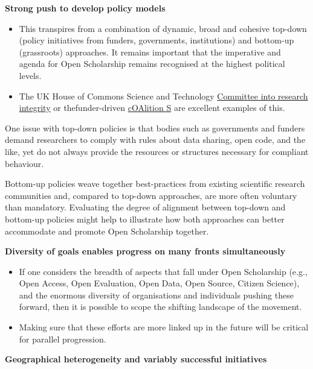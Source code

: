 \textbf{Strong push to develop policy models}

\begin{itemize}
\item
  This transpires from a combination of dynamic, broad and cohesive
  top-down (policy initiatives from funders, governments, institutions)
  and bottom-up (grassroots) approaches. It remains important that the
  imperative and agenda for Open Scholarship remains recognised at the
  highest political levels.
\item
  The UK House of Commons Science and Technology
  \href{https://www.parliament.uk/business/committees/committees-a-z/commons-select/science-and-technology-committee/news-parliament-2017/research-integrity3-evidence-17-19/}{Committee
  into research integrity} or thefunder-driven
  \href{https://www.coalition-s.org/}{cOAlition S} are excellent
  examples of this.
\end{itemize}

One issue with top-down policies is that bodies such as governments and
funders demand researchers to comply with rules about data sharing, open
code, and the like, yet do not always provide the resources or
structures necessary for compliant behaviour.

Bottom-up policies weave together best-practices from existing
scientific research communities and, compared to top-down approaches,
are more often voluntary than mandatory. Evaluating the degree of
alignment between top-down and bottom-up policies might help to
illustrate how both approaches can better accommodate and promote Open
Scholarship together.

\textbf{Diversity of goals enables progress on many fronts
simultaneously}

\begin{itemize}
\item
  If one considers the breadth of aspects that fall under Open
  Scholarship (e.g., Open Access, Open Evaluation, Open Data, Open
  Source, Citizen Science), and the enormous diversity of organisations
  and individuals pushing these forward, then it is possible to scope
  the shifting landscape of the movement.
\item
  Making sure that these efforts are more linked up in the future will
  be critical for parallel progression.
\end{itemize}

\textbf{Geographical heterogeneity and variably successful initiatives}

